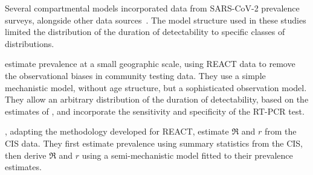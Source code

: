 \documentclass[thesis.tex]{subfiles}
\begin{document}
Several compartmental models incorporated data from SARS-CoV-2 prevalence surveys, alongside other data sources~\autocite{daviesAssociation,ironsEstimating,knockKey,nicholsonImproving,pooleyEstimation,birrellRTM2}.
The model structure used in these studies limited the distribution of the duration of detectability to specific classes of distributions.

\Textcite{nicholsonImproving} estimate prevalence at a small geographic scale, using REACT data to remove the observational biases in community testing data.
They use a simple mechanistic model, without age structure, but a sophisticated observation model.
They allow an arbitrary distribution of the duration of detectability, based on the estimates of \textcite{hellewellPCRSensitivity}, and incorporate the sensitivity and specificity of the RT-PCR test.

\Textcite{mccabeCISincidence}, adapting the methodology \textcite{ealesAppropriately} developed for REACT, estimate $\Re$ and $r$ from the CIS data.
They first estimate prevalence using summary statistics from the CIS, then derive $\Re$ and $r$ using a semi-mechanistic model fitted to their prevalence estimates.

\end{document}
